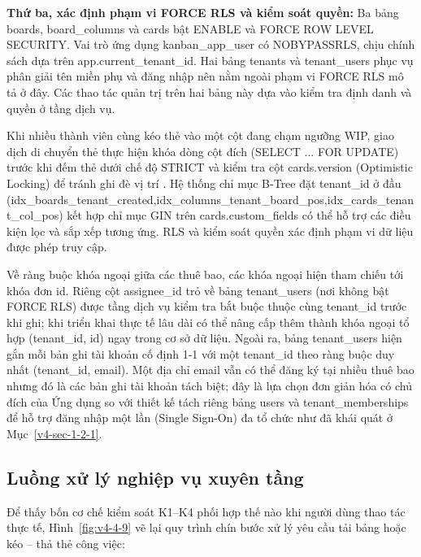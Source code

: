 \textbf{Thứ ba, xác định phạm vi FORCE RLS và kiểm soát quyền:} Ba bảng boards, board\_\allowbreak{}columns và cards bật ENABLE và FORCE ROW LEVEL SECURITY. Vai trò ứng dụng kanban\_\allowbreak{}app\_\allowbreak{}user có NOBYPASSRLS, chịu chính sách dựa trên app.current\_\allowbreak{}tenant\_\allowbreak{}id. Hai bảng tenants và tenant\_\allowbreak{}users phục vụ phân giải tên miền phụ và đăng nhập nên nằm ngoài phạm vi FORCE RLS mô tả ở đây. Các thao tác quản trị trên hai bảng này dựa vào kiểm tra định danh và quyền ở tầng dịch vụ.

Khi nhiều thành viên cùng kéo thẻ vào một cột đang chạm ngưỡng WIP, giao dịch di chuyển thẻ thực hiện khóa dòng cột đích (SELECT ... FOR UPDATE) trước khi đếm thẻ dưới chế độ STRICT và kiểm tra cột cards.version (Optimistic Locking) để tránh ghi đè vị trí \cite{v4-23}. Hệ thống chỉ mục B-Tree đặt tenant\_\allowbreak{}id ở đầu (idx\_\allowbreak{}boards\_\allowbreak{}tenant\_\allowbreak{}created,idx\_\allowbreak{}columns\_\allowbreak{}tenant\_\allowbreak{}board\_\allowbreak{}pos,idx\_\allowbreak{}cards\_\allowbreak{}tenant\_\allowbreak{}col\_\allowbreak{}pos) kết hợp chỉ mục GIN trên cards.custom\_\allowbreak{}fields có thể hỗ trợ các điều kiện lọc và sắp xếp tương ứng. RLS và kiểm soát quyền xác định phạm vi dữ liệu được phép truy cập.

Về ràng buộc khóa ngoại giữa các thuê bao, các khóa ngoại hiện tham chiếu tới khóa đơn id. Riêng cột assignee\_\allowbreak{}id trỏ về bảng tenant\_\allowbreak{}users (nơi không bật FORCE RLS) được tầng dịch vụ kiểm tra bắt buộc thuộc cùng tenant\_\allowbreak{}id trước khi ghi; khi triển khai thực tế lâu dài có thể nâng cấp thêm thành khóa ngoại tổ hợp (tenant\_\allowbreak{}id, id) ngay trong cơ sở dữ liệu. Ngoài ra, bảng tenant\_\allowbreak{}users hiện gắn mỗi bản ghi tài khoản cố định 1-1 với một tenant\_\allowbreak{}id theo ràng buộc duy nhất (tenant\_\allowbreak{}id, email). Một địa chỉ email vẫn có thể đăng ký tại nhiều thuê bao nhưng đó là các bản ghi tài khoản tách biệt; đây là lựa chọn đơn giản hóa có chủ đích của Ứng dụng so với thiết kế tách riêng bảng users và tenant\_\allowbreak{}memberships để hỗ trợ đăng nhập một lần (Single Sign-On) đa tổ chức như đã khái quát ở Mục~\ref{v4-sec-1-2-1}.

\begin{landscape}
\renewcommand{\VfourImageMaxHeight}{.62\textheight}
\subsection{Luồng xử lý nghiệp vụ xuyên tầng}\label{v4-sec-4-3-3}

Để thấy bốn cơ chế kiểm soát K1--K4 phối hợp thế nào khi người dùng thao tác thực tế, Hình~\ref{fig:v4-4-9} vẽ lại quy trình chín bước xử lý yêu cầu tải bảng hoặc kéo -- thả thẻ công việc:
\end{landscape}

